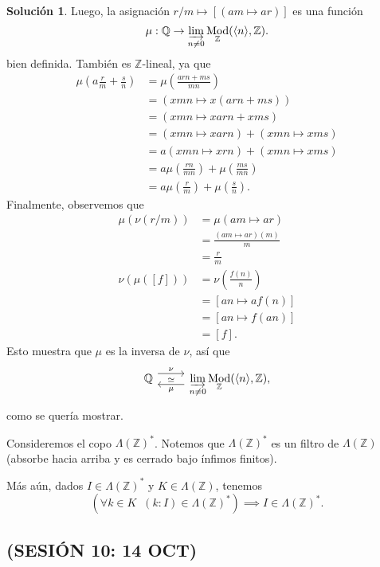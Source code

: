 \documentclass[12pt,letterpaper,titlepage]{article}
\theoremstyle{definition}
\newtheorem*{sol}{Solución}
\newcommand\Z{\mathbb Z}
\newcommand\Q{\mathbb Q}
\newcommand\<{\langle}
\renewcommand\>{\rangle}
\DeclareMathOperator{\Mod}{Mod}
\begin{document}
\begin{sol}
    Luego, la asignación $r/m\mapsto [(am\mapsto ar)]$
    es una función
    \[
        \mu:\Q\to\varinjlim_{n\neq 0}\Mod_\Z(\<n\>,\Z)
    .\]
    bien definida.
    También es $\Z$-lineal, ya que
    \begin{align*}
        \mu\left(a\frac r m + \frac s n\right)
        &= \mu\left(\frac{arn + ms}{mn}\right) \\
        &= \left( xmn \mapsto x(arn+ms) \right) \\
        &= (xmn \mapsto xarn+xms) \\
        &= (xmn \mapsto xarn) + (xmn \mapsto xms) \\
        &= a(xmn \mapsto xrn) + (xmn \mapsto xms) \\
        &= a\mu\left(\frac{rn}{mn}\right)
            + \mu\left(\frac{ms}{mn}\right) \\
        &= a\mu\left(\frac{r}{m}\right)
            + \mu\left(\frac{s}{n}\right).
    \end{align*}
    Finalmente, observemos que
    \begin{align*}
        \mu(\nu(r/m))
        &= \mu(am\mapsto ar) \\
        &= \frac{(am\mapsto ar)(m)}{m} \\
        &= \frac{r}{m} \\
        \nu(\mu([f]))
        &= \nu\left(\frac{f(n)} n \right) \\
        &= [an\mapsto af(n)] \\
        &= [an\mapsto f(an)] \\
        &= [f]
    .\end{align*}
    Esto muestra que $\mu$ es la inversa
    de $\nu$, así que
    \[
        \begin{tikzcd}
        \mathbb Q \ar[r,shift left=2,"\nu"] &
        \displaystyle
        \varinjlim_{n\neq 0}\Mod_\Z(\<n\>,\Z),
        \ar[l,shift left=2,"\mu","\simeq"']
       \end{tikzcd} 
    \]
    como se quería mostrar.
\end{sol}

Consideremos el copo $\Lambda(\Z)^*$.
Notemos que $\Lambda(\Z)^*$ es un filtro de
$\Lambda(\Z)$ (absorbe hacia arriba
y es cerrado bajo ínfimos finitos).

Más aún, dados $I\in\Lambda(\Z)^*$ y $K\in\Lambda(\Z)$, tenemos
\[
    (\forall k\in K \;\; (k:I)\in\Lambda(\Z)^*) \implies I\in\Lambda(\Z)^*
.\]

\subsection*{(SESIÓN 10: 14 OCT)}
\end{document}
